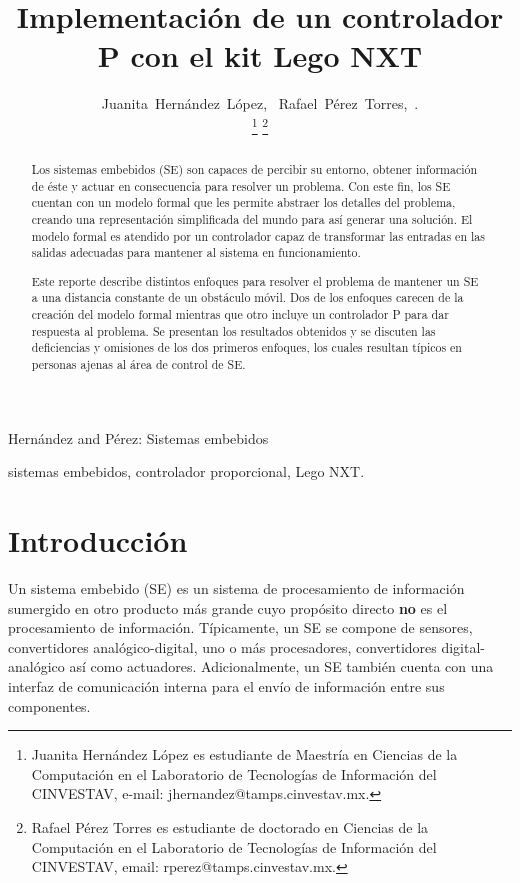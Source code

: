 \documentclass[journal]{IEEEtran}
\begin{document}
\title{Implementación de un controlador P con el kit Lego NXT}

\author{Juanita~Hernández~López,~
        Rafael~Pérez~Torres,~.

	\thanks{Juanita Hernández López es estudiante de Maestría en Ciencias de la Computación en el Laboratorio de Tecnologías de Información del CINVESTAV, e-mail: jhernandez@tamps.cinvestav.mx.}
	\thanks{Rafael Pérez Torres es estudiante de doctorado en Ciencias de la Computación en el Laboratorio de Tecnologías de Información del CINVESTAV, email: rperez@tamps.cinvestav.mx.}
}

%
{Hernández and Pérez: Sistemas embebidos}

\maketitle

\begin{abstract}
Los sistemas embebidos (SE) son capaces de percibir su entorno, obtener información de éste y actuar en consecuencia para resolver un problema. Con este fin, los SE cuentan con un modelo formal que les permite abstraer los detalles del problema, creando una representación simplificada del mundo para así generar una solución. El modelo formal es atendido por un controlador capaz de transformar las entradas en las salidas adecuadas para mantener al sistema en funcionamiento.

Este reporte describe distintos enfoques para resolver el problema de mantener un SE a una distancia constante de un obstáculo móvil. Dos de los enfoques carecen de la creación del modelo formal mientras que otro incluye un controlador P para dar respuesta al problema. Se presentan los resultados obtenidos y se discuten las deficiencias y omisiones de los dos primeros enfoques, los cuales resultan típicos en personas ajenas al área de control de SE.

\end{abstract}

\begin{IEEEkeywords}
sistemas embebidos, controlador proporcional, Lego NXT.
\end{IEEEkeywords}

\section{Introducción}
Un sistema embebido (SE) es un sistema de procesamiento de información sumergido en otro producto más grande cuyo propósito directo \textbf{no} es el procesamiento de información.
Típicamente, un SE se compone de sensores, convertidores analógico-digital, uno o más procesadores, convertidores digital-analógico así como actuadores.
Adicionalmente, un SE también cuenta con una interfaz de comunicación interna para el envío de información entre sus componentes.
\end{document}

